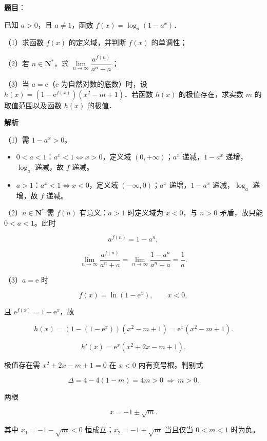 \begin{answer}

\textbf{题目}：

已知 $a>0$，且 $a\neq1$，函数 $f(x)=\log_a(1-a^x)$．

（1）求函数 $f(x)$ 的定义域，并判断 $f(x)$ 的单调性；

（2）若 $n\in\mathbf N^*$，求 $\lim\limits_{n\to\infty}\dfrac{a^{f(n)}}{a^n+a}$；

（3）当 $a=\mathrm e$（$\mathrm e$ 为自然对数的底数）时，设 $h(x)=(1-\mathrm e^{f(x)})(x^2-m+1)$．若函数 $h(x)$ 的极值存在，求实数 $m$ 的取值范围以及函数 $h(x)$ 的极值．

\textbf{解析}

（1）需 $1-a^x>0$。

\begin{itemize}
\item $0<a<1$：$a^x<1\iff x>0$，定义域 $(0,+\infty)$；$a^x$ 递减，$1-a^x$ 递增，$\log_a$ 递减，故 $f$ 递减。
\item $a>1$：$a^x<1\iff x<0$，定义域 $(-\infty,0)$；$a^x$ 递增，$1-a^x$ 递减，$\log_a$ 递增，故 $f$ 递减。
\end{itemize}

（2）$n\in\mathbf N^*$ 需 $f(n)$ 有意义：$a>1$ 时定义域为 $x<0$，与 $n>0$ 矛盾，故只能 $0<a<1$。此时

\nopagebreak[4]
\[a^{f(n)}=1-a^n,\]

\nopagebreak[4]
\[\lim_{n\to\infty}\frac{a^{f(n)}}{a^n+a}
=\lim_{n\to\infty}\frac{1-a^n}{a^n+a}=\frac1a .\]

（3）$a=\mathrm e$ 时

\nopagebreak[4]
\[f(x)=\ln(1-\mathrm e^x),\qquad x<0,\]

且 $\mathrm e^{f(x)}=1-\mathrm e^x$，故

\nopagebreak[4]
\[h(x)=\left(1-(1-\mathrm e^x)\right)(x^2-m+1)
=\mathrm e^x(x^2-m+1).\]

\nopagebreak[4]
\[h'(x)=\mathrm e^x\left(x^2+2x-m+1\right).\]

极值存在需 $x^2+2x-m+1=0$ 在 $x<0$ 内有变号根。判别式

\nopagebreak[4]
\[\Delta=4-4(1-m)=4m>0\ \Longrightarrow\ m>0 .\]

两根

\nopagebreak[4]
\[x=-1\pm\sqrt m .\]

其中 $x_1=-1-\sqrt m<0$ 恒成立；$x_2=-1+\sqrt m$ 当且仅当 $0<m<1$ 时为负。


\end{answer}
